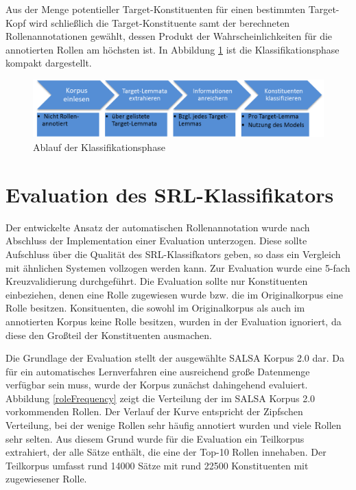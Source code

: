 \documentclass[12pt]{article}
\begin{document}
Aus der Menge potentieller Target-Konstituenten für einen bestimmten Target-Kopf wird schließlich die Target-Konstituente samt der berechneten Rollenannotationen gewählt, dessen Produkt der Wahrscheinlichkeiten für die annotierten Rollen am höchsten ist.
In Abbildung \ref{classify} ist die Klassifikationsphase kompakt dargestellt.

	\begin{figure}[tb!]
		\centering
		\includegraphics[scale=0.6]{images/ablaufAnnotate.png}
		\caption{Ablauf der Klassifikationsphase}
		\label{classify}
	\end{figure}

\section{Evaluation des SRL-Klassifikators}

Der entwickelte Ansatz der automatischen Rollenannotation wurde nach Abschluss
der Implementation einer Evaluation unterzogen. Diese sollte Aufschluss über die
Qualität des SRL-Klassifkators geben, so dass ein Vergleich mit ähnlichen
Systemen vollzogen werden kann. Zur Evaluation wurde eine 5-fach Kreuzvalidierung durchgeführt. Die Evaluation sollte nur Konstituenten einbeziehen, denen eine Rolle zugewiesen wurde bzw. die im Originalkorpus eine Rolle besitzen. Konsituenten, die sowohl im Originalkorpus als auch im annotierten Korpus keine Rolle besitzen, wurden in der Evaluation ignoriert, da diese den Großteil der Konstituenten ausmachen.

Die Grundlage der Evaluation stellt der ausgewählte SALSA Korpus 2.0 dar. Da für ein automatisches Lernverfahren eine ausreichend große Datenmenge verfügbar sein muss, wurde der Korpus zunächst dahingehend evaluiert. Abbildung \ref{roleFrequency} zeigt die Verteilung der im SALSA Korpus 2.0 vorkommenden Rollen. Der Verlauf der Kurve entspricht der Zipfschen Verteilung, bei der wenige Rollen sehr häufig annotiert wurden und viele Rollen sehr selten. Aus diesem Grund wurde für die Evaluation ein Teilkorpus extrahiert, der alle Sätze enthält, die eine der Top-10 Rollen innehaben. Der Teilkorpus umfasst rund 14000 Sätze mit rund 22500 Konstituenten mit zugewiesener Rolle.
\end{document}
